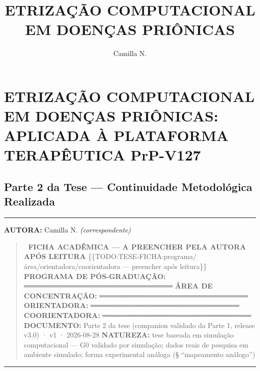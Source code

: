 \documentclass[
  12pt,
]{report}
\title{ETRIZAÇÃO COMPUTACIONAL EM DOENÇAS PRIÔNICAS}
\author{Camilla N.}
\date{}
\begin{document}
\maketitle

\hypertarget{etrizauxe7uxe3o-computacional-em-doenuxe7as-priuxf4nicas-aplicada-uxe0-plataforma-terapuxeautica-prp-v127}{%
\chapter{ETRIZAÇÃO COMPUTACIONAL EM DOENÇAS PRIÔNICAS: APLICADA À
PLATAFORMA TERAPÊUTICA
PrP-V127}\label{etrizauxe7uxe3o-computacional-em-doenuxe7as-priuxf4nicas-aplicada-uxe0-plataforma-terapuxeautica-prp-v127}}

\hypertarget{parte-2-da-tese-continuidade-metodoluxf3gica-realizada}{%
\section{Parte 2 da Tese --- Continuidade Metodológica
Realizada}\label{parte-2-da-tese-continuidade-metodoluxf3gica-realizada}}

\begin{center}\rule{0.5\linewidth}{0.5pt}\end{center}

\textbf{AUTORA:} Camilla N. \emph{(correspondente)}

\begin{quote}
🔖 \textbf{FICHA ACADÊMICA --- A PREENCHER PELA AUTORA APÓS LEITURA}
\{\{TODO:TESE-FICHA:programa/área/orientadora/coorientadora ---
preencher após leitura\}\} \textbf{PROGRAMA DE PÓS-GRADUAÇÃO:}
══════════════════════════════ \textbf{ÁREA DE CONCENTRAÇÃO:}
══════════════════════════════ \textbf{ORIENTADORA:}
══════════════════════════════ \textbf{COORIENTADORA:}
══════════════════════════════ \textbf{DOCUMENTO:} Parte 2 da tese
(companion validado da Parte 1, release v3.0) · v1 · 2026-08-28
\textbf{NATUREZA:} tese baseada em simulação computacional --- G0
validado por simulação; dados reais de pesquisa em ambiente simulado;
forma experimental análoga (§ ``mapeamento análogo'')
\end{quote}

\begin{center}\rule{0.5\linewidth}{0.5pt}\end{center}
\end{document}
